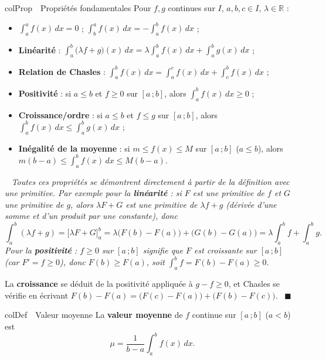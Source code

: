 \documentclass[11pt,a4paper]{article}
\newenvironment{definition}[1][Définition]
  {\begin{fiche}{colDef}{\ding{110}~~#1}}{\end{fiche}}
\newenvironment{propriete}[1][Propriété]
  {\begin{fiche}{colProp}{\ding{72}~~#1}}{\end{fiche}}
\newenvironment{demo}
  {\par\smallskip\noindent{\sffamily\bfseries\color{qtealdark}Démonstration.}\ \itshape}
  {\ \normalfont\hfill$\blacksquare$\par\medskip}
\begin{document}
\begin{propriete}[Propriétés fondamentales]
Pour $f,g$ continues sur $I$, $a,b,c\in I$, $\lambda\in\mathbb{R}$ :
\begin{itemize}[leftmargin=6mm, itemsep=0.5mm]
  \item $\displaystyle\int_a^a f(x)\,dx = 0$ ; \quad $\displaystyle\int_b^a f(x)\,dx = -\int_a^b f(x)\,dx$ ;
  \item \textbf{Linéarité} : $\displaystyle\int_a^b\bigl(\lambda f+g\bigr)(x)\,dx = \lambda\int_a^b f(x)\,dx+\int_a^b g(x)\,dx$ ;
  \item \textbf{Relation de Chasles} : $\displaystyle\int_a^b f(x)\,dx = \int_a^c f(x)\,dx+\int_c^b f(x)\,dx$ ;
  \item \textbf{Positivité} : si $a\leq b$ et $f\geq0$ sur $[a\,;b]$, alors $\displaystyle\int_a^b f(x)\,dx\geq0$ ;
  \item \textbf{Croissance/ordre} : si $a\leq b$ et $f\leq g$ sur $[a\,;b]$, alors $\displaystyle\int_a^b f(x)\,dx\leq\int_a^b g(x)\,dx$ ;
  \item \textbf{Inégalité de la moyenne} : si $m\leq f(x)\leq M$ sur $[a\,;b]$ ($a\leq b$), alors $m(b-a)\leq\displaystyle\int_a^b f(x)\,dx\leq M(b-a)$.
\end{itemize}
\end{propriete}

\begin{demo}
Toutes ces propriétés se démontrent directement à partir de la définition avec une primitive. Par exemple pour la \textbf{linéarité} : si $F$ est une primitive de $f$ et $G$ une primitive de $g$, alors $\lambda F+G$ est une primitive de $\lambda f+g$ (dérivée d'une somme et d'un produit par une constante), donc
\[
  \int_a^b(\lambda f+g) = \bigl[\lambda F+G\bigr]_a^b = \lambda\bigl(F(b)-F(a)\bigr)+\bigl(G(b)-G(a)\bigr) = \lambda\int_a^b f+\int_a^b g.
\]
Pour la \textbf{positivité} : $f\geq0$ sur $[a\,;b]$ signifie que $F$ est croissante sur $[a\,;b]$ (car $F'=f\geq0$), donc $F(b)\geq F(a)$, soit $\int_a^bf=F(b)-F(a)\geq0$.

\smallskip
La \textbf{croissance} se déduit de la positivité appliquée à $g-f\geq0$, et Chasles se vérifie en écrivant $F(b)-F(a) = \bigl(F(c)-F(a)\bigr)+\bigl(F(b)-F(c)\bigr)$.
\end{demo}

\begin{definition}[Valeur moyenne]
La \textbf{valeur moyenne} de $f$ continue sur $[a\,;b]$ ($a<b$) est
\[
  \mu = \frac{1}{b-a}\int_a^b f(x)\,dx.
\]
\end{definition}
\end{document}
